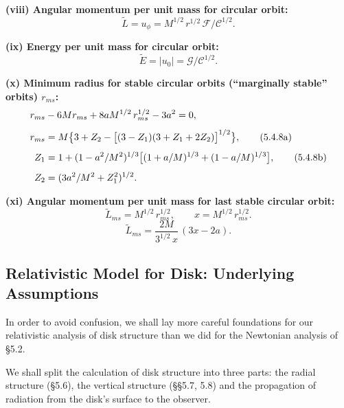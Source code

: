 \medskip
\noindent
\textbf{(viii) Angular momentum per unit mass for circular orbit:}
%
\begin{equation}
\tilde{L} = u_\phi = M^{1/2}\,r^{1/2}\,\mathscr{F}/\mathscr{C}^{1/2}.
\tag{5.4.7a}
\end{equation}

\medskip
\noindent
\textbf{(ix) Energy per unit mass for circular orbit:}
%
\begin{equation}
\tilde{E} = |u_0| = \mathscr{G}/\mathscr{C}^{1/2}.
\tag{5.4.7b}
\end{equation}

\medskip
\noindent
\textbf{(x) Minimum radius for stable circular orbits (``marginally stable'' orbits) $r_{ms}$:}
%
\begin{align}
r_{ms} &- 6Mr_{ms} + 8aM^{1/2}\,r_{ms}^{1/2} - 3a^2 = 0,\notag\\[4pt]
r_{ms} &= M\bigl\{3 + Z_2 - \bigl[(3 - Z_1)(3 + Z_1 + 2Z_2)\bigr]^{1/2}\bigr\},
\tag{5.4.8a}\\[4pt]
Z_1 &= 1 + (1 - a^2/M^2)^{1/3}\bigl[(1 + a/M)^{1/3} + (1 - a/M)^{1/3}\bigr],
\tag{5.4.8b}\\[4pt]
Z_2 &= (3a^2/M^2 + Z_1^2)^{1/2}.
\end{align}

\medskip
\noindent
\textbf{(xi) Angular momentum per unit mass for last stable circular orbit:}
%
\begin{equation}
\tilde{L}_{ms} = M^{1/2}\,r_{ms}^{1/2},\qquad
x = M^{1/2}\,r_{ms}^{1/2}.
\tag{5.4.9}
\end{equation}
%
\begin{equation}
\tilde{L}_{ms} = \frac{2M}{3^{1/2}\,x}\,(3x - 2a).
\end{equation}



\subsection{Relativistic Model for Disk: Underlying Assumptions}
\label{sec:5.5}

In order to avoid confusion, we shall lay more careful foundations for our
relativistic analysis of disk structure than we did for the Newtonian analysis
of \S5.2.

We shall split the calculation of disk structure into three parts: the radial
structure (\S5.6), the vertical structure (\S\S5.7, 5.8) and the propagation of
radiation from the disk's surface to the observer.

